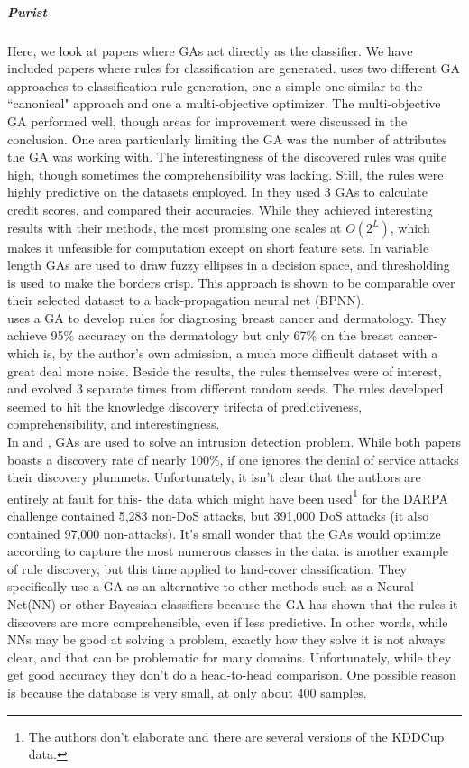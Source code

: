 \subparagraph{Purist}
Here, we look at papers where GAs act directly as the classifier.  We have included papers where rules for classification are generated.  \cite{dehuri_application_2008} uses two different GA approaches to classification rule generation, one a simple one similar to the  ``canonical" approach and one a multi-objective optimizer.  The multi-objective GA performed well, though areas for improvement were discussed in the conclusion.  One area particularly limiting the GA was the number of attributes the GA was working with.  The interestingness of the discovered rules was quite high, though sometimes the comprehensibility was lacking.  Still, the rules were highly predictive on the datasets employed.
In \cite{kozeny_genetic_2015} they used 3 GAs to calculate credit scores, and compared their accuracies.  While they achieved interesting results with their methods, the most promising one scales at $O(2^L)$, which makes it unfeasible for computation except on short feature sets.  In \cite{srikanth_variable-length_1995} variable length GAs are used to draw fuzzy ellipses in a decision space, and thresholding is used to make the borders crisp.  This approach is shown to be comparable over their selected dataset to a back-propagation neural net (BPNN).\\
\cite{fidelis_discovering_2000} uses a GA to develop rules for diagnosing breast cancer and dermatology.  They achieve 95\% accuracy on the dermatology but only 67\% on the breast cancer- which is, by the author's own admission, a much more difficult dataset with a great deal more noise.  Beside the results, the rules themselves were of interest, and evolved 3 separate times from different random seeds.   The rules developed seemed to hit the knowledge discovery trifecta of predictiveness, comprehensibility, and interestingness.\\
In \cite{hoque_implementation_2012} and \cite{li_application_2012}, GAs are used to solve an intrusion detection problem.  While both papers boasts a discovery rate of nearly 100\%, if one ignores the denial of service attacks their discovery plummets.  Unfortunately, it isn't clear that the authors are entirely at fault for this- the data which might have been used\footnote{The authors don't elaborate and there are several versions of the KDDCup data.} for the DARPA challenge contained 5,283 non-DoS attacks, but 391,000 DoS attacks (it also contained 97,000 non-attacks).  It’s small wonder that the GAs would optimize according to capture the most numerous classes in the data.
\cite{tseng_genetic_2008} is another example of rule discovery, but this time applied to land-cover classification.  They specifically use a GA as an alternative to other methods such as a Neural Net(NN) or other Bayesian classifiers because the GA has shown that the rules it discovers are more comprehensible, even if less predictive.  In other words, while NNs may be good at solving a problem, exactly how they solve it is not always clear, and that can be problematic for many domains.  Unfortunately, while they get good accuracy they don't do a head-to-head comparison.  One possible reason is because the database is very small, at only about 400 samples.\\
